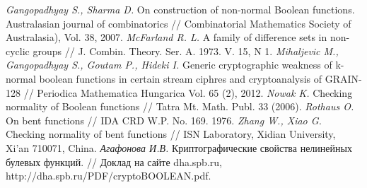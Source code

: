 \begin{thebibliography}{99}
 {\it Gangopadhyay S., Sharma D.} On construction of non-normal Boolean functions. Australasian journal of combinatorics // Combinatorial Mathematics Society of Australasia), Vol. 38, 2007.
 {\it McFarland R. L.} A family of difference sets in non-cyclic groups // J. Combin. Theory. Ser. A. 1973. V. 15, N 1.
 {\it Mihaljevic M., Gangopadhyay S., Goutam P., Hideki I.} Generic cryptographic weakness of k-normal boolean functions in certain stream ciphres and cryptoanalysis of GRAIN-128 // Periodica Mathematica Hungarica Vol. 65 (2), 2012.
 {\it Nowak K.} Checking normality of Boolean functions // Tatra Mt. Math. Publ. 33 (2006).
 {\it Rothaus O.} On bent functions // IDA CRD W.P. No. 169. 1976.
 {\it Zhang W., Xiao G.} Checking normality of bent functions // ISN Laboratory, Xidian University, Xi’an 710071, China.
 {\it Агафонова И.В.} Криптографические свойства нелинейных булевых функций. // Доклад на сайте dha.spb.ru, http://dha.spb.ru/PDF/cryptoBOOLEAN.pdf.









\end{thebibliography}
